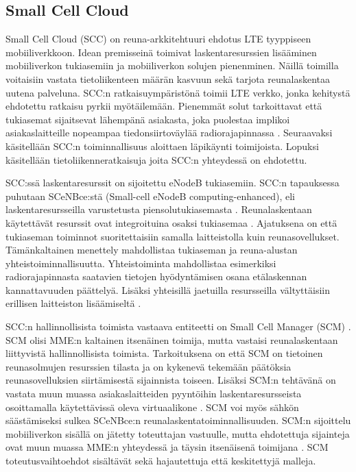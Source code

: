 

\subsection{Small Cell Cloud} \label{scc}

Small Cell Cloud (SCC) on reuna-arkkitehtuuri ehdotus LTE tyyppiseen mobiiliverkkoon.
Idean premisseinä toimivat laskentaresurssien lisääminen mobiiliverkon tukiasemiin ja mobiiliverkon solujen pienenminen.
Näillä toimilla voitaisiin vastata tietoliikenteen määrän kasvuun sekä tarjota reunalaskentaa uutena palveluna.
SCC:n ratkaisuympäristönä toimii LTE verkko, jonka kehitystä ehdotettu ratkaisu pyrkii myötäilemään.
Pienemmät solut tarkoittavat että tukiasemat sijaitsevat lähempänä asiakasta, joka puolestaa implikoi asiakaslaitteille nopeampaa tiedonsiirtoväylää radiorajapinnassa \cite{lobillo15scc}.
Seuraavaksi käsitellään SCC:n toiminnallisuus aloittaen läpikäynti toimijoista. Lopuksi käsitellään tietoliikenneratkaisuja joita SCC:n yhteydessä on ehdotettu.

SCC:ssä laskentaresurssit on sijoitettu eNodeB tukiasemiin. SCC:n tapauksessa puhutaan SCeNBce:stä (Small-cell eNodeB computing-enhanced), eli laskentaresursseilla varustetusta piensolutukiasemasta \cite{lobillo15scc}.
Reunalaskentaan käytettävät resurssit ovat integroituina osaksi tukiasemaa \cite{puente15seamless}.
Ajatuksena on että tukiaseman toiminnot suoritettaisiin samalla laitteistolla kuin reunasovellukset.
Tämänkaltainen menettely mahdollistaa tukiaseman ja reuna-alustan yhteistoiminnallisuutta.
Yhteistoiminta mahdollistaa esimerkiksi radiorajapinnasta saatavien tietojen hyödyntämisen osana etälaskennan kannattavuuden päättelyä.
Lisäksi yhteisillä jaetuilla resursseilla vältyttäisiin erillisen laitteiston lisäämiseltä \cite{puente15seamless}.

SCC:n hallinnollisista toimista vastaava entiteetti on Small Cell Manager (SCM) \cite{lobillo15scc}.
SCM olisi MME:n kaltainen itsenäinen toimija, mutta vastaisi reunalaskentaan liittyvistä hallinnollisista toimista.
Tarkoituksena on että SCM on tietoinen reunasolmujen resurssien tilasta ja on kykenevä tekemään päätöksia reunasovelluksien siirtämisestä sijainnista toiseen. 
Lisäksi SCM:n tehtävänä on vastata muun muassa asiakaslaitteiden pyyntöihin laskentaresursseista osoittamalla käytettävissä oleva virtuaalikone \cite{dolezal2016performance}.
SCM voi myös sähkön säästämiseksi sulkea SCeNBce:n reunalaskentatoiminnallisuuden.
SCM:n sijoittelu mobiiliverkon sisällä on jätetty toteuttajan vastuulle, mutta ehdotettuja sijainteja ovat muun muassa MME:n yhteydessä ja täysin itsenäisenä toimijana \cite{lobillo15scc}.
SCM toteutusvaihtoehdot sisältävät sekä hajautettuja että keskitettyjä malleja.

